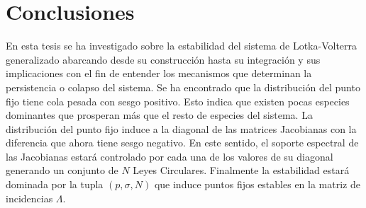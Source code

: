 \section{Conclusiones}

En esta tesis se ha investigado sobre la estabilidad del sistema de Lotka-Volterra generalizado abarcando desde su construcción hasta su integración y sus implicaciones con el fin de entender los mecanismos que determinan la persistencia o colapso del sistema. Se ha encontrado que la distribución del punto fijo tiene cola pesada con sesgo positivo. Esto indica que existen pocas especies dominantes que prosperan más que el resto de especies del sistema. La distribución del punto fijo induce a la diagonal de las matrices Jacobianas con la diferencia que ahora tiene sesgo negativo. En este sentido, el soporte espectral de las Jacobianas estará controlado por cada una de los valores de su diagonal generando un conjunto de $N$ Leyes Circulares. Finalmente la estabilidad estará dominada por la tupla $(p,\sigma,N)$ que induce puntos fijos estables en la matriz de incidencias $\Lambda$. \\
\\
